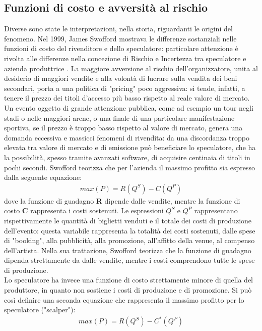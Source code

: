 \subsection{Funzioni di costo e avversità al rischio}
Diverse sono state le interpretazioni, nella storia, riguardanti le origini del fenomeno. Nel 1999, James Swofford mostrava le differenze sostanziali nelle funzioni di costo del rivenditore e dello speculatore: particolare attenzione è rivolta alle differenze nella concezione di Rischio e Incertezza tra speculatore e azienda produttrice \cite{swofford1999arbitrage}. 
La maggiore avversione al rischio dell'organizzatore, unita al desiderio di maggiori vendite e alla volontà di lucrare sulla vendita dei beni secondari, porta a una politica di "pricing" poco aggressiva: si tende, infatti, a tenere il prezzo dei titoli d'accesso più basso rispetto al reale valore di mercato. 
Un evento oggetto di grande attenzione pubblica, come ad esempio un tour negli stadi o nelle maggiori arene, o una finale di una particolare manifestazione sportiva, se il prezzo è troppo basso rispetto al valore di mercato, genera una domanda eccessiva e massicci fenomeni di rivendita: da una discordanza troppo elevata tra valore di mercato e di emissione può beneficiare lo speculatore, che ha la possibilità, spesso tramite avanzati software, di acquisire centinaia di titoli in pochi secondi. 
Swofford teorizza che per l'azienda il massimo profitto sia espresso dalla seguente equazione:
\begin{align*}
 \textbf{$max(P) = R(Q^{S})  - C(Q^{P})$}
\end{align*}
dove la funzione di guadagno \textbf{R} dipende dalle vendite, mentre la funzione di costo \textbf{C} rappresenta i costi sostenuti. 
Le espressioni $Q^{S}$ e $Q^{P}$ rappresentano rispettivamente le quantità di biglietti venduti e il totale dei costi di produzione dell'evento: questa variabile rappresenta la totalità dei costi sostenuti, dalle spese di "booking", alla pubblicità, alla promozione, all'affitto della venue, al compenso dell'artista. Nella sua trattazione, Swofford teorizza che la funzione di guadagno dipenda strettamente da dalle vendite, mentre i costi comprendono tutte le spese di produzione. \\
Lo speculatore ha invece una funzione di costo strettamente minore di quella del produttore, in quanto non sostiene i costi di produzione e di promozione. Si può così definire una seconda equazione che rappresenta il massimo profitto per lo speculatore ("scalper"): 
\begin{align*}
\textbf{$max(P) = R(Q^{S})  - C^{*}(Q^{P})$}
\end{align*}
